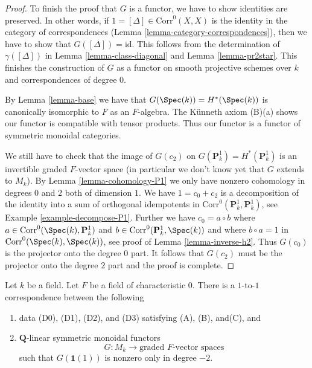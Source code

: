 \begin{proof}
\medskip\noindent
To finish the proof that $G$ is a functor,
we have to show identities are preserved. In other words, if
$1 = [\Delta] \in \text{Corr}^0(X, X)$ is the identity in the category
of correspondences (Lemma \ref{lemma-category-correspondences}),
then we have to show that $G([\Delta]) = \text{id}$.
This follows from the determination
of $\gamma([\Delta])$ in Lemma \ref{lemma-class-diagonal}
and Lemma \ref{lemma-pr2star}.
This finishes the construction of $G$ as a functor on
smooth projective schemes over $k$ and correspondences of degree $0$.

\medskip\noindent
By Lemma \ref{lemma-base} we have that
$G(\Spec(k)) = H^*(\Spec(k))$ is canonically isomorphic to $F$
as an $F$-algebra. The K\"unneth axiom (B)(a)
shows our functor is compatible with tensor products.
Thus our functor is a functor of symmetric monoidal categories.

\medskip\noindent
We still have to check that the image of $G(c_2)$ on
$G(\mathbf{P}^1_k) = H^*(\mathbf{P}^1_k)$
is an invertible graded $F$-vector space (in particular we don't know yet
that $G$ extends to $M_k$). By Lemma \ref{lemma-cohomology-P1}
we only have nonzero cohomology in degrees $0$ and $2$
both of dimension $1$. We have $1 = c_0 + c_2$ is a decomposition
of the identity into a sum of orthogonal idempotents in
$\text{Corr}^0(\mathbf{P}^1_k, \mathbf{P}^1_k)$, see
Example \ref{example-decompose-P1}. Further we have $c_0 = a \circ b$ where
$a \in \text{Corr}^0(\Spec(k), \mathbf{P}^1_k)$ and
$b \in \text{Corr}^0(\mathbf{P}^1_k, \Spec(k))$ and where
$b \circ a = 1$ in $\text{Corr}^0(\Spec(k), \Spec(k))$, see proof of
Lemma \ref{lemma-inverse-h2}. Thus $G(c_0)$ is the projector
onto the degree $0$ part. It follows that $G(c_2)$ must
be the projector onto the degree $2$ part and the proof is complete.
\end{proof}

\begin{proposition}
\label{proposition-weil-cohomology-theory}
Let $k$ be a field. Let $F$ be a field of characteristic $0$. There is a
$1$-to-$1$ correspondence between the following
\begin{enumerate}
\item data (D0), (D1), (D2), and (D3) satisfying (A), (B), and(C), and
\item $\mathbf{Q}$-linear symmetric monoidal functors
$$
G : M_k \longrightarrow \text{graded }F\text{-vector spaces}
$$
such that $G(\mathbf{1}(1))$ is nonzero only in degree $-2$.
\end{enumerate}
\end{proposition}

